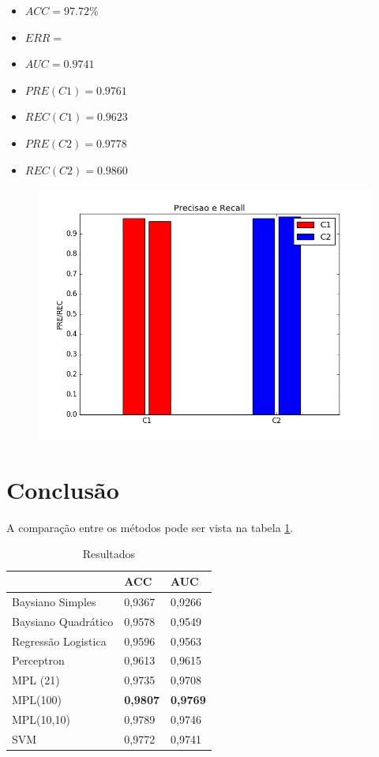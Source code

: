\documentclass[11pt,a4paper]{article}
\numberwithin{equation}{section}
\begin{document}
\begin{minipage}{.5\textwidth}
\begin{itemize}
\item $ACC = 97.72 \%$
\item $ERR =  $
\item $AUC = 0.9741  $
\item $PRE(C1) = 0.9761$
\item $REC(C1) = 0.9623$
\item $PRE(C2) = 0.9778$
\item $REC(C2) = 0.9860$
\end{itemize}
\end{minipage}%
\begin{minipage}{.5\textwidth}
\begin{figure}[H]
\centering
  \includegraphics[width=\linewidth]{../img/svm.png}
  \label{fig:percep}
\end{figure}
\end{minipage}%

\section{Conclusão}
A comparação entre os métodos pode ser vista na tabela \ref{tab:results}.
\begin{table}[H]
\centering
\caption{Resultados}
\label{tab:results}
\begin{tabular}{l l l} \hline
 & \textbf{ACC} & \textbf{AUC}\\
\hline
Baysiano Simples & 0,9367 & 0,9266 \\ 
Baysiano Quadrático & 0,9578 & 0,9549 \\ 
Regressão Logistica & 0,9596 & 0,9563 \\ 
Perceptron & 0,9613 & 0,9615 \\ 
MPL (21) & 0,9735 & 0,9708 \\ 
MPL(100) & \textbf{0,9807} & \textbf{0,9769} \\ 
MPL(10,10) & 0,9789 & 0,9746 \\ 
SVM & 0,9772 & 0,9741 \\ 
\hline
\end{tabular}
\end{table}
\end{document}
